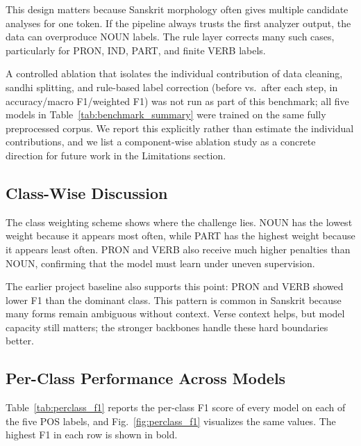 \documentclass[conference]{IEEEtran}
\begin{document}
This design matters because Sanskrit morphology often gives multiple candidate analyses for one token. If the pipeline always trusts the first analyzer output, the data can overproduce NOUN labels. The rule layer corrects many such cases, particularly for PRON, IND, PART, and finite VERB labels.

A controlled ablation that isolates the individual contribution of data cleaning, sandhi splitting, and rule-based label correction (before vs.\ after each step, in accuracy/macro F1/weighted F1) was not run as part of this benchmark; all five models in Table~\ref{tab:benchmark_summary} were trained on the same fully preprocessed corpus. We report this explicitly rather than estimate the individual contributions, and we list a component-wise ablation study as a concrete direction for future work in the Limitations section.

\subsection{Class-Wise Discussion}
The class weighting scheme shows where the challenge lies. NOUN has the lowest weight because it appears most often, while PART has the highest weight because it appears least often. PRON and VERB also receive much higher penalties than NOUN, confirming that the model must learn under uneven supervision.

The earlier project baseline also supports this point: PRON and VERB showed lower F1 than the dominant class. This pattern is common in Sanskrit because many forms remain ambiguous without context. Verse context helps, but model capacity still matters; the stronger backbones handle these hard boundaries better.

\subsection{Per-Class Performance Across Models}
\label{sec:perclass}
Table~\ref{tab:perclass_f1} reports the per-class F1 score of every model on each of the five POS labels, and Fig.~\ref{fig:perclass_f1} visualizes the same values. The highest F1 in each row is shown in bold.
\end{document}
